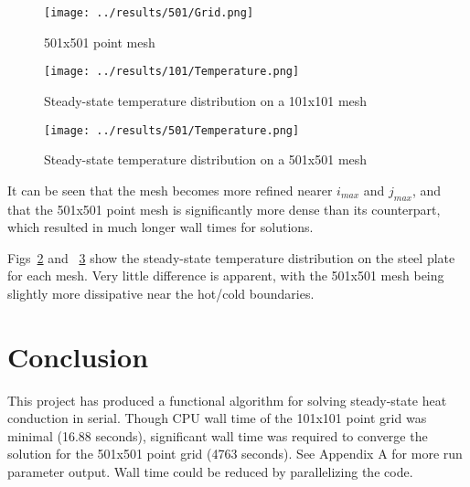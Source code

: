 \documentclass[twocolumn,10pt]{asme2ej}
\begin{document}
\begin{figure}[htb]
\begin{center}
\texttt{[image: ../results/501/Grid.png]}
\caption{501x501 point mesh}
\label{grid501}
\end{center}
\end{figure}

\begin{figure}[htb]
\begin{center}
\texttt{[image: ../results/101/Temperature.png]}
\caption{Steady-state temperature distribution on a 101x101 mesh}
\label{temp101}
\end{center}
\end{figure}

\begin{figure}[htb]
\begin{center}
\texttt{[image: ../results/501/Temperature.png]}
\caption{Steady-state temperature distribution on a 501x501 mesh}
\label{temp501}
\end{center}
\end{figure}

\noindent It can be seen that the mesh becomes more refined nearer $i_{max}$ and $j_{max}$, and that the 501x501 point mesh is significantly more dense than its counterpart, which resulted in much longer wall times for solutions.

Figs~\ref{temp101} and ~\ref{temp501} show the steady-state temperature distribution on the steel plate for each mesh.  Very little difference is apparent, with the 501x501 mesh being slightly more dissipative near the hot/cold boundaries.

\section{Conclusion}

This project has produced a functional algorithm for solving steady-state heat conduction in serial.  Though CPU wall time of the 101x101 point grid was minimal (16.88 seconds), significant wall time was required to converge the solution for the 501x501 point grid (4763 seconds).  See Appendix A for more run parameter output.  Wall time could be reduced by parallelizing the code.
\end{document}
